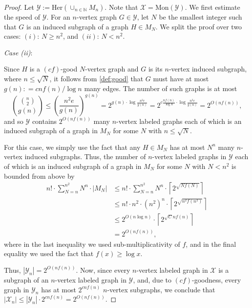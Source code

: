 \documentclass[letterpaper,11pt]{article}
\newcommand{\Smul}{sub-multiplicativity\xspace}
\newcommand{\Nn}{\mathbb{N}}
\newcommand{\Xc}{\mathcal{X}}
\newcommand{\Yc}{\mathcal{Y}}
\theoremstyle{definition}
\theoremstyle{remark}
\newcommand{\her}{\mathrm{Her}}
\newcommand{\mon}{\mathrm{Mon}}
\renewcommand{\leq}{\leqslant}
\renewcommand{\geq}{\geqslant}
\begin{document}
 	\begin{proof}
 	Let $\Yc := \her(\cup_{n \in \Nn} M_n)$. Note that $\Xc = \mon(\Yc)$.
 	We first estimate the speed of $\Yc$.
 	For an $n$-vertex graph $G\in \Yc$, let $N$ be the smallest integer such that $G$ is an induced subgraph of a graph $H \in M_N$. We split the proof over two cases: $(i)$: $N \geq n^2$, and $(ii)$: $N < n^2$. 
 	\begin{labeling}{\textit{Case (ii)}:}
 		\item[\textit{Case (i)}:] Since $H$ is a $(cf)$-good $N$-vertex graph and $G$ is its $n$-vertex induced subgraph, where $n \leq \sqrt{N}$, it follows from  \cref{def:good} that $G$ must have at most $g(n): = cnf(n)/\log n$ many edges. The number of such graphs is at most  
 		\[
 		\binom{\binom{n}{2}}{g(n) } \leq \left( \frac{n^2 e}{ g(n)} \right)^{g(n)}= 	2^{g(n)\cdot \log \frac{n^2e}{g(n)}} = 2^{c\frac{nf(n)}{\log n}\cdot \log \frac{n^2e}{g(n)}} = 2^{O(nf(n))},
 		\] 
 		and so $\Yc$ contains $2^{O(nf(n))}$ many $n$-vertex labeled graphs 
 		each of which is an induced subgraph of a graph in $M_N$ for some $N$ with $n \leq \sqrt{N}$.
 		\item[\textit{Case (ii)}:] For this case, we simply use the fact that any
 		$H \in M_N$ has at most $N^n$ many $n$-vertex induced subgraphs.
 		Thus, the number of $n$-vertex labeled graphs in $\Yc$
 		each of which is an induced subgraph of a graph in $M_N$ for some $N$ with $N < n^2$ is bounded from above by
 		\begin{align*}
 			n! \cdot \sum_{N=n}^{n^{2}} N^n\cdot  |M_N| 
 			& \leq 
 			n! \cdot \sum_{N=n}^{n^{2}} N^n\cdot  \left\lceil 2^{\sqrt{Nf(N)}} \right\rceil  \\
 			& \leq 
 			n! \cdot n^{2} \cdot (n^{2})^n \cdot\left\lceil  2^{\sqrt{n^2f(n^{2})}}\right\rceil \\
 			& \leq 2^{O(n \log n)} \cdot\left\lceil  2^{\sqrt{C}nf(n)}\right\rceil\\
 			&=  2^{O(nf(n))},
 		\end{align*}
 		where in the last inequality we used \Smul of $f$, and in the final equality we used the fact that $f(x)\geq \log x$.
 	\end{labeling} 
 	 Thus, $|\Yc_n| = 2^{O(nf(n))}$. 
 	 Now, since every $n$-vertex labeled graph in $\Xc$ is a subgraph of an $n$-vertex labeled
 	 graph in $\Yc$, and, due to $(cf)$-goodness, every graph in $\Yc_n$
 	 has at most $2^{cnf(n)}$ $n$-vertex subgraphs, we conclude that
 	 $|\Xc_n| \leq |\Yc_n| \cdot 2^{cnf(n)} = 2^{O(nf(n))}$.
 	\end{proof}
\end{document}
